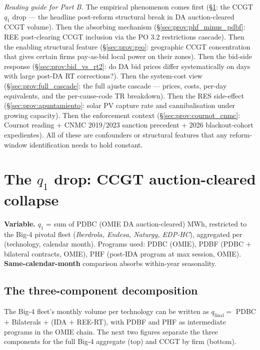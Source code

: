 \documentclass[11pt,a4paper]{article}
\begin{document}
\smallskip

\noindent\emph{Reading guide for Part B.} The empirical phenomenon comes first (\S\ref{sec:prov:q1_drop}: the CCGT $q_1$ drop --- the headline post-reform structural break in DA auction-cleared CCGT volume). Then the absorbing mechanism (\S\ref{sec:prov:phf_minus_pdbf}: REE post-clearing CCGT inclusion via the PO 3.2 restrictions cascade). Then the enabling structural feature (\S\ref{sec:prov:geo}: geographic CCGT concentration that gives certain firms pay-as-bid local power on their zones). Then the bid-side response (\S\ref{sec:prov:bid_vs_rt2}: do DA bid prices differ systematically on days with large post-DA RT corrections?). Then the system-cost view (\S\ref{sec:prov:full_cascade}: the full ajuste cascade --- prices, costs, per-day equivalents, and the per-cause-code TR breakdown). Then the RES side-effect (\S\ref{sec:prov:apuntamiento}: solar PV capture rate and cannibalisation under growing capacity). Then the enforcement context (\S\ref{sec:prov:cournot_cnmc}: Cournot reading + CNMC 2019/2023 sanction precedent + 2026 blackout-cohort expedientes). All of these are confounders or structural features that any reform-window identification needs to hold constant.

\section{The $q_1$ drop: CCGT auction-cleared collapse}\label{sec:prov:q1_drop}

\textbf{Variable.} $q_1$ = sum of PDBC (OMIE DA auction-cleared) MWh, restricted to the Big-4 pivotal fleet (\emph{Iberdrola, Endesa, Naturgy, EDP-HC}), aggregated per (technology, calendar month). Programs used: PDBC (OMIE), PDBF (PDBC $+$ bilateral contracts, OMIE), PHF (post-IDA program at max session, OMIE). \textbf{Same-calendar-month} comparison absorbs within-year seasonality.

\subsection{The three-component decomposition}\label{sec:prov:q1_drop:components}

\noindent The Big-4 fleet's monthly volume per technology can be written as $q_{\text{final}} = $ PDBC $+$ Bilaterals $+$ (IDA $+$ REE-RT), with PDBF and PHF as intermediate programs in the OMIE chain. The next two figures separate the three components for the full Big-4 aggregate (top) and CCGT by firm (bottom).
\end{document}

